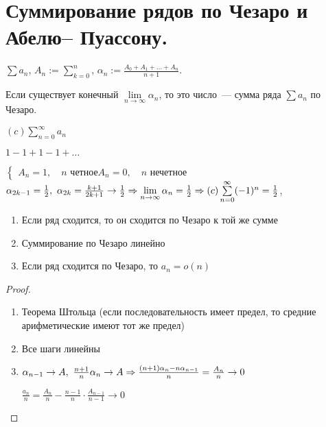 \section{Суммирование рядов по Чезаро и Абелю–
Пуассону.}

\begin{definition}
    $\sum a_n$, $A_n := \sum\limits_{k = 0}^{n}$,
    $\alpha_n := \frac{A_0 + A_1 + \ldots + A_n}{n + 1}$.

    Если существует конечный  $\lim\limits_{n \to \infty}\alpha_n$,
    то это число~--- сумма ряда $\sum a_n$ по Чезаро.
\end{definition}

\begin{designation}
    $(c) \sum\limits_{n = 0}^\infty a_n$
\end{designation}

\begin{example}
    $1 - 1 + 1 - 1 + \ldots$
    
    $\begin{cases}
            A_n = 1,\quad n \text{ четное}   
            
            A_n = 0,\quad n \text{ нечетное} 
            
        \end{cases}$ $\alpha_{2k -1} = \frac{1}{2},\ \alpha_{2k} = \frac{k + 1}{2k + 1} \to \frac{1}{2} \Rightarrow
        \lim\limits_{n \to \infty}\al_n = \frac{1}{2} \Rightarrow (c)\sum\limits_{n = 0}^\infty (-1)^n = \frac{1}{2}$,
\end{example}

\begin{theorem}
    \leavevmode
    \begin{enumerate}
        \item Если ряд сходится, то он сходится по Чезаро к той же сумме
        \item Суммирование по Чезаро линейно
        \item Если ряд сходится по Чезаро, то $a_n = o(n)$
    \end{enumerate}
\end{theorem}

\begin{proof}
    \leavevmode
    \begin{enumerate}
        \item Теорема Штольца (если последовательность имеет предел, то средние арифметические имеют тот же предел)
        \item Все шаги линейны
        \item $\alpha_{n-1} \to A,\ \frac{n+1}{n}\alpha_n \to A \Rightarrow \frac{(n+1)\alpha_{n} - n\alpha_{n-1}}{n} = \frac{A_n}{n} \to 0$
        
              $\frac{a_n}{n} = \frac{A_n}{n} - \frac{n - 1}{n} \cdot \frac{A_{n-1}}{n -1} \to 0$
    \end{enumerate}
\end{proof}

